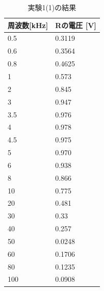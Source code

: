\documentclass[11pt,a4paper,fleqn]{jsarticle}
\begin{document}
\begin{table}[!h]
\centering
\caption{実験1(1)の結果}
\label{cal:result1(1)}
\begin{tabular}{|l|l|}
\hline
周波数{[}kHz{]} & Rの電圧 {[}V{]} \\ \hline \hline
0.5          & 0.3119       \\ \hline
0.6          & 0.3564       \\ \hline
0.8          & 0.4625       \\ \hline
1            & 0.573        \\ \hline
2            & 0.845        \\ \hline
3            & 0.947        \\ \hline
3.5          & 0.976        \\ \hline
4            & 0.978        \\ \hline
4.5          & 0.975        \\ \hline
5            & 0.970        \\ \hline
6            & 0.938        \\ \hline
8            & 0.866        \\ \hline
10           & 0.775        \\ \hline
20           & 0.481        \\ \hline
30           & 0.33         \\ \hline
40           & 0.257        \\ \hline
50           & 0.0248       \\ \hline
60           & 0.1706       \\ \hline
80           & 0.1235       \\ \hline
100          & 0.0908       \\ \hline
\end{tabular}
\end{table}
\end{document}
